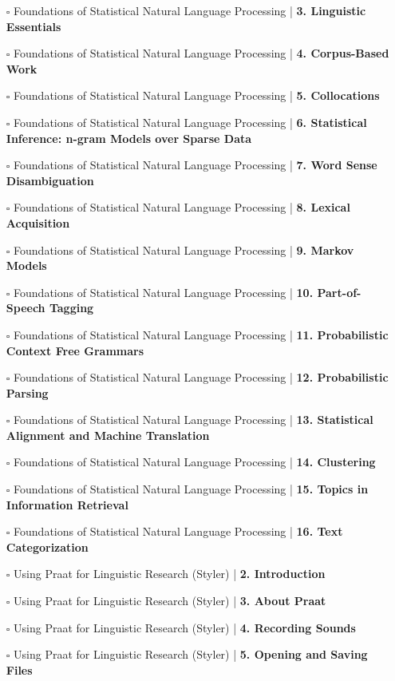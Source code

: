 \documentclass[a4, landscape, 12pt]{article}
\newcommand{\checkbox}{$\square$}%
\begin{document}
\begin{itemize}
{}
\item [\checkbox]  Foundations of Statistical Natural Language Processing | \textbf{ 3. Linguistic Essentials
}
\item [\checkbox]  Foundations of Statistical Natural Language Processing | \textbf{ 4. Corpus-Based Work
}
\item [\checkbox]  Foundations of Statistical Natural Language Processing | \textbf{ 5. Collocations
}
\item [\checkbox]  Foundations of Statistical Natural Language Processing | \textbf{ 6. Statistical Inference: n-gram Models over Sparse Data
}
\item [\checkbox]  Foundations of Statistical Natural Language Processing | \textbf{ 7. Word Sense Disambiguation
}
\item [\checkbox]  Foundations of Statistical Natural Language Processing | \textbf{ 8. Lexical Acquisition
}
\item [\checkbox]  Foundations of Statistical Natural Language Processing | \textbf{ 9. Markov Models
}
\item [\checkbox]  Foundations of Statistical Natural Language Processing | \textbf{ 10. Part-of-Speech Tagging
}
\item [\checkbox]  Foundations of Statistical Natural Language Processing | \textbf{ 11. Probabilistic Context Free Grammars
}
\item [\checkbox]  Foundations of Statistical Natural Language Processing | \textbf{ 12. Probabilistic Parsing
}
\item [\checkbox]  Foundations of Statistical Natural Language Processing | \textbf{ 13. Statistical Alignment and Machine Translation
}
\item [\checkbox]  Foundations of Statistical Natural Language Processing | \textbf{ 14. Clustering
}
\item [\checkbox]  Foundations of Statistical Natural Language Processing | \textbf{ 15. Topics in Information Retrieval
}
\item [\checkbox]  Foundations of Statistical Natural Language Processing | \textbf{ 16. Text Categorization
}
\item [\checkbox]  Using Praat for Linguistic Research (Styler) | \textbf{ 2. Introduction
}
\item [\checkbox]  Using Praat for Linguistic Research (Styler) | \textbf{ 3. About Praat
}
\item [\checkbox]  Using Praat for Linguistic Research (Styler) | \textbf{ 4. Recording Sounds
}
\item [\checkbox]  Using Praat for Linguistic Research (Styler) | \textbf{ 5. Opening and Saving Files
}
\end{itemize}
\end{document}
